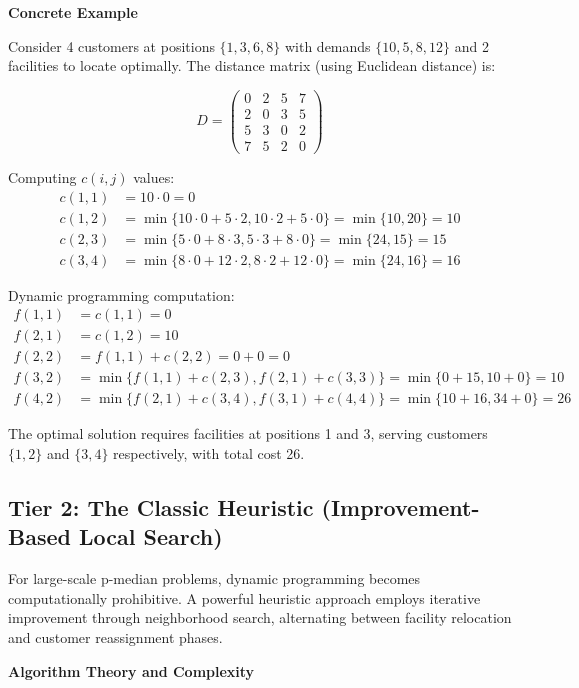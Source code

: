 \documentclass{article}
\begin{document}
\textbf{Concrete Example}

Consider 4 customers at positions \(\{1, 3, 6, 8\}\) with demands \(\{10, 5, 8, 12\}\) and 2 facilities to locate optimally. The distance matrix (using Euclidean distance) is:

\[D = \begin{pmatrix}
0 & 2 & 5 & 7 \\
2 & 0 & 3 & 5 \\
5 & 3 & 0 & 2 \\
7 & 5 & 2 & 0
\end{pmatrix}\]

Computing \(c(i,j)\) values:
\begin{align}
c(1,1) &= 10 \cdot 0 = 0 \\
c(1,2) &= \min\{10 \cdot 0 + 5 \cdot 2, 10 \cdot 2 + 5 \cdot 0\} = \min\{10, 20\} = 10 \\
c(2,3) &= \min\{5 \cdot 0 + 8 \cdot 3, 5 \cdot 3 + 8 \cdot 0\} = \min\{24, 15\} = 15 \\
c(3,4) &= \min\{8 \cdot 0 + 12 \cdot 2, 8 \cdot 2 + 12 \cdot 0\} = \min\{24, 16\} = 16
\end{align}

Dynamic programming computation:
\begin{align}
f(1,1) &= c(1,1) = 0 \\
f(2,1) &= c(1,2) = 10 \\
f(2,2) &= f(1,1) + c(2,2) = 0 + 0 = 0 \\
f(3,2) &= \min\{f(1,1) + c(2,3), f(2,1) + c(3,3)\} = \min\{0 + 15, 10 + 0\} = 10 \\
f(4,2) &= \min\{f(2,1) + c(3,4), f(3,1) + c(4,4)\} = \min\{10 + 16, 34 + 0\} = 26
\end{align}

The optimal solution requires facilities at positions 1 and 3, serving customers \(\{1,2\}\) and \(\{3,4\}\) respectively, with total cost 26.

\subsection{Tier 2: The Classic Heuristic (Improvement-Based Local Search)}

For large-scale p-median problems, dynamic programming becomes computationally prohibitive. A powerful heuristic approach employs iterative improvement through neighborhood search, alternating between facility relocation and customer reassignment phases.

\textbf{Algorithm Theory and Complexity}
\end{document}
